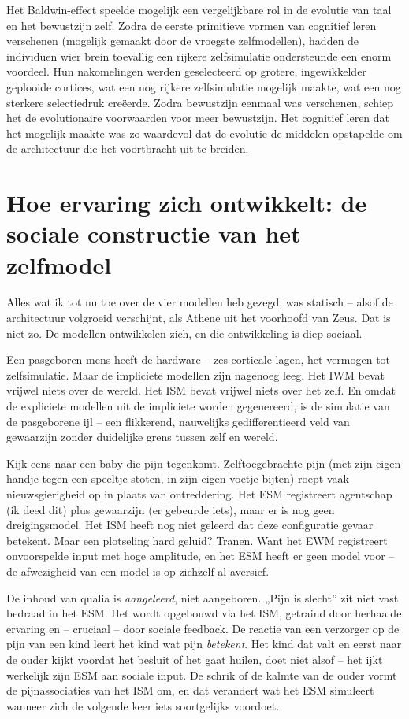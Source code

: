 \documentclass[11pt, twoside, openright]{book}
\begin{document}
Het Baldwin-effect speelde mogelijk een vergelijkbare rol in de evolutie van taal en het bewustzijn zelf. Zodra de eerste primitieve vormen van cognitief leren verschenen (mogelijk gemaakt door de vroegste zelfmodellen), hadden de individuen wier brein toevallig een rijkere zelfsimulatie ondersteunde een enorm voordeel. Hun nakomelingen werden geselecteerd op grotere, ingewikkelder geplooide cortices, wat een nog rijkere zelfsimulatie mogelijk maakte, wat een nog sterkere selectiedruk creëerde. Zodra bewustzijn eenmaal was verschenen, schiep het de evolutionaire voorwaarden voor meer bewustzijn. Het cognitief leren dat het mogelijk maakte was zo waardevol dat de evolutie de middelen opstapelde om de architectuur die het voortbracht uit te breiden.

\section*{Hoe ervaring zich ontwikkelt: de sociale constructie van het zelfmodel}

Alles wat ik tot nu toe over de vier modellen heb gezegd, was statisch -- alsof de architectuur volgroeid verschijnt, als Athene uit het voorhoofd van Zeus. Dat is niet zo. De modellen ontwikkelen zich, en die ontwikkeling is diep sociaal.

Een pasgeboren mens heeft de hardware -- zes corticale lagen, het vermogen tot zelfsimulatie. Maar de impliciete modellen zijn nagenoeg leeg. Het IWM bevat vrijwel niets over de wereld. Het ISM bevat vrijwel niets over het zelf. En omdat de expliciete modellen uit de impliciete worden gegenereerd, is de simulatie van de pasgeborene ijl -- een flikkerend, nauwelijks gedifferentieerd veld van gewaarzijn zonder duidelijke grens tussen zelf en wereld.

Kijk eens naar een baby die pijn tegenkomt. Zelftoegebrachte pijn (met zijn eigen handje tegen een speeltje stoten, in zijn eigen voetje bijten) roept vaak nieuwsgierigheid op in plaats van ontreddering. Het ESM registreert agentschap (ik deed dit) plus gewaarzijn (er gebeurde iets), maar er is nog geen dreigingsmodel. Het ISM heeft nog niet geleerd dat deze configuratie gevaar betekent. Maar een plotseling hard geluid? Tranen. Want het EWM registreert onvoorspelde input met hoge amplitude, en het ESM heeft er geen model voor -- de afwezigheid van een model is op zichzelf al aversief.

De inhoud van qualia is \textit{aangeleerd}, niet aangeboren. „Pijn is slecht” zit niet vast bedraad in het ESM. Het wordt opgebouwd via het ISM, getraind door herhaalde ervaring en -- cruciaal -- door sociale feedback. De reactie van een verzorger op de pijn van een kind leert het kind wat pijn \textit{betekent}. Het kind dat valt en eerst naar de ouder kijkt voordat het besluit of het gaat huilen, doet niet alsof -- het ijkt werkelijk zijn ESM aan sociale input. De schrik of de kalmte van de ouder vormt de pijnassociaties van het ISM om, en dat verandert wat het ESM simuleert wanneer zich de volgende keer iets soortgelijks voordoet.
\end{document}
